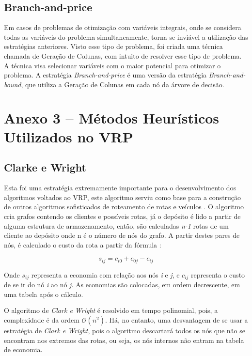 \subsection*{Branch-and-price}
Em casos de problemas de otimização com variáveis integrais, onde se considera todas as variáveis do problema simultaneamente, torna-se inviável a utilização das estratégias anteriores. Visto esse tipo de problema, foi criada uma técnica chamada de Geração de Colunas, com intuito de resolver esse tipo de problema. A técnica visa selecionar variáveis com o maior potencial para otimizar o problema. A estratégia \emph{Branch-and-price} é uma versão da estratégia \emph{Branch-and-bound}, que utiliza a Geração de Colunas  em cada nó da árvore de decisão.

\section*{Anexo 3 -- Métodos Heurísticos Utilizados no VRP}

\subsection*{Clarke e Wright}

Esta foi uma estratégia extremamente importante para o desenvolvimento dos algoritmos voltados ao VRP, este algoritmo serviu como base para a construção de outros algoritmos sofisticados de roteamento de rotas e veículos \cite{milton-nascimento}. O algoritmo cria grafos contendo os clientes e possíveis rotas, já o depósito é lido a partir de alguma estrutura de armazenamento, então, são calculadas \emph{n-1} rotas de um cliente ao depósito onde n é o número de nós do grafo. A partir destes pares de nós, é calculado  o custo da rota a partir da fórmula \cite[p. 32]{maxwell}: 

\[ s_{ij} = c_{i0} + c_{0j} - c_{ij} \]

Onde $s_{ij}$ representa a economia com relação aos nós \emph{i} e \emph{j}, e $c_{ij}$ representa o custo de se ir do nó \emph{i} ao nó \emph{j}. As economias são colocadas, em ordem decrescente, em uma tabela após o cálculo. 

O algoritmo de \emph{Clark e Wright} é resolvido em tempo polinomial, pois, a complexidade é da ordem $\mathcal{O}(n^2)$. Há, no entanto, uma desvantagem de se usar a estratégia de \emph{Clark e Wright}, pois o algoritmo descartará todos os nós que não se encontram nos extremos das rotas, ou seja, os nós internos não entram na tabela de economia.

